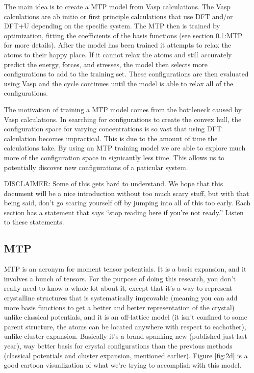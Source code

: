 \documentclass{article}
\begin{document}
The main idea is to create a MTP model from Vasp calculations. The
Vasp calculations are ab initio or first principle calculations that
use DFT and/or DFT+U depending on the specific system. The MTP then is
trained by optimization, fitting the coefficients of the basis
functions (see section \ref{sec:MTP}:MTP for more details). After the
model has been trained it attempts to relax the atoms to their happy
place. If it cannot relax the atoms and still accurately predict the
energy, forces, and stresses, the model then selects more
configurations to add to the training set. These configurations are
then evaluated using Vasp and the cycle continues until the model is
able to relax all of the configurations.

The motivation of training a MTP model comes from the bottleneck
caused by Vasp calculations. In searching for configurations to create the
convex hull, the configuration space for varying concentrations is so vast
that using DFT calculation becomes impractical. This is due to the amount of
time the calculations take. By using an MTP training model we are able
to explore much more of the configuration space in signicantly less
time. This allows us to potentially discover new configurations of
a paticular system.

DISCLAIMER: Some of this gets hard to understand. We hope that this
document will be a nice introduction without too much scary stuff, but
with that being said, don't go scaring yourself off by jumping into all
of this too early. Each section has a statement that says ``stop
reading here if you're not ready.'' Listen to these statements. 


\subsection{MTP} \label{sec:MTP}
MTP is an acronym for moment tensor potentials. It is a basis
expansion, and it involves a bunch of tensors. For the purpose of
doing this research, you don't really need to know a whole lot about
it, except that it's a way to represent crystalline structures that is
systematically improvable (meaning you can add more basis functions to
get a better and better representation of the crystal) unlike
classical potentials, and it is an off-lattice model (it isn't
confined to some parent structure, the atoms can be located anywhere
with respect to eachother), unlike cluster expansion. Basically it's a
brand spanking new (published just last year), way better basis for
crystal configurations than the previous methods (classical potentials
and cluster expansion, mentioned earlier). Figure \ref{fig:2d} is a
good cartoon visualization of what we're trying to accomplish with
this model. 
\end{document}
